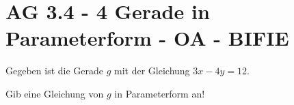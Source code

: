\section{AG 3.4 - 4 Gerade in Parameterform - OA - BIFIE}

\begin{beispiel}[AG 3.4]{1} %
Gegeben ist die Gerade $g$ mit der Gleichung $3x-4y=12$.

Gib eine Gleichung von $g$ in Parameterform an!

\end{beispiel}